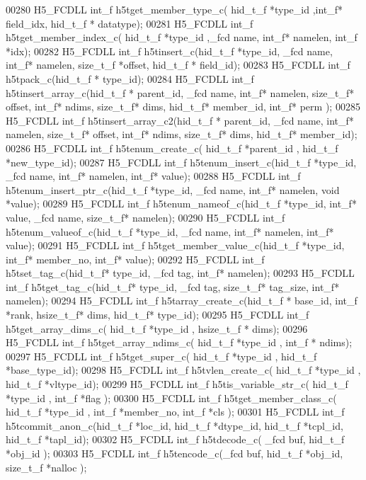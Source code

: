\begin{DoxyCode}
00280 H5\_FCDLL int\_f h5tget\_member\_type\_c( hid\_t\_f *type\_id ,int\_f* field\_idx, hid\_t\_f * datatype);
00281 H5\_FCDLL int\_f h5tget\_member\_index\_c( hid\_t\_f *type\_id ,\_fcd name, int\_f* namelen, int\_f *idx);
00282 H5\_FCDLL int\_f h5tinsert\_c(hid\_t\_f *type\_id, \_fcd name, int\_f* namelen, size\_t\_f *offset, hid\_t\_f * 
      field\_id);
00283 H5\_FCDLL int\_f h5tpack\_c(hid\_t\_f * type\_id);
00284 H5\_FCDLL int\_f h5tinsert\_array\_c(hid\_t\_f * parent\_id, \_fcd name, int\_f* namelen, size\_t\_f* offset, int\_f* 
      ndims, size\_t\_f* dims, hid\_t\_f* member\_id, int\_f* perm );
00285 H5\_FCDLL int\_f h5tinsert\_array\_c2(hid\_t\_f * parent\_id, \_fcd name, int\_f* namelen, size\_t\_f* offset, int\_f* 
      ndims, size\_t\_f* dims, hid\_t\_f* member\_id);
00286 H5\_FCDLL int\_f h5tenum\_create\_c( hid\_t\_f *parent\_id , hid\_t\_f *new\_type\_id);
00287 H5\_FCDLL int\_f h5tenum\_insert\_c(hid\_t\_f *type\_id, \_fcd name, int\_f* namelen, int\_f* value);
00288 H5\_FCDLL int\_f h5tenum\_insert\_ptr\_c(hid\_t\_f *type\_id, \_fcd name, int\_f* namelen, \textcolor{keywordtype}{void} *value);
00289 H5\_FCDLL int\_f h5tenum\_nameof\_c(hid\_t\_f *type\_id, int\_f* value, \_fcd name, size\_t\_f* namelen);
00290 H5\_FCDLL int\_f h5tenum\_valueof\_c(hid\_t\_f *type\_id, \_fcd name, int\_f* namelen, int\_f* value);
00291 H5\_FCDLL int\_f h5tget\_member\_value\_c(hid\_t\_f *type\_id, int\_f* member\_no, int\_f* value);
00292 H5\_FCDLL int\_f h5tset\_tag\_c(hid\_t\_f* type\_id, \_fcd tag, int\_f* namelen);
00293 H5\_FCDLL int\_f h5tget\_tag\_c(hid\_t\_f* type\_id, \_fcd tag, size\_t\_f* tag\_size, int\_f* namelen);
00294 H5\_FCDLL int\_f h5tarray\_create\_c(hid\_t\_f * base\_id, int\_f *rank, hsize\_t\_f* dims, hid\_t\_f* type\_id);
00295 H5\_FCDLL int\_f h5tget\_array\_dims\_c( hid\_t\_f *type\_id , hsize\_t\_f * dims);
00296 H5\_FCDLL int\_f h5tget\_array\_ndims\_c( hid\_t\_f *type\_id , int\_f * ndims);
00297 H5\_FCDLL int\_f h5tget\_super\_c( hid\_t\_f *type\_id , hid\_t\_f *base\_type\_id);
00298 H5\_FCDLL int\_f h5tvlen\_create\_c( hid\_t\_f *type\_id , hid\_t\_f *vltype\_id);
00299 H5\_FCDLL int\_f h5tis\_variable\_str\_c( hid\_t\_f *type\_id , int\_f *flag );
00300 H5\_FCDLL int\_f h5tget\_member\_class\_c( hid\_t\_f *type\_id ,  int\_f *member\_no, int\_f *cls );
00301 H5\_FCDLL int\_f h5tcommit\_anon\_c(hid\_t\_f *loc\_id, hid\_t\_f *dtype\_id, hid\_t\_f *tcpl\_id, hid\_t\_f *tapl\_id);
00302 H5\_FCDLL int\_f h5tdecode\_c( \_fcd buf, hid\_t\_f *obj\_id );
00303 H5\_FCDLL int\_f h5tencode\_c(\_fcd buf, hid\_t\_f *obj\_id, size\_t\_f *nalloc );

\end{DoxyCode}
